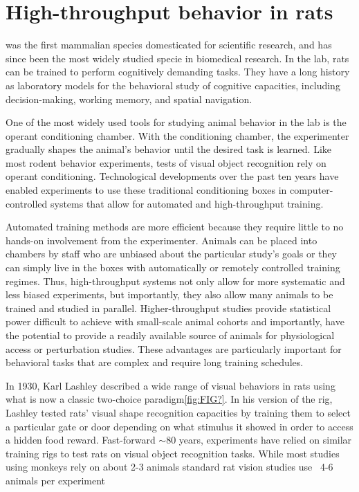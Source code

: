 
\chapter{High-throughput behavior in rats}
 was the first mammalian species domesticated for scientific research\cite{Jacob199}, and has since been the most widely studied specie in biomedical research. In the lab, rats can be trained to perform cognitively demanding tasks. They have a long history as laboratory models for the behavioral study of cognitive capacities, including decision-making\cite{Brunton2013, Raposo2012, Miller2017TwoStep, Piet2018RatsEnvironment}, working memory\cite{Bratch2016}, and spatial navigation\cite{OKeefe1971, Whishaw1995, Aronov2014}. 

One of the most widely used tools for studying animal behavior in the lab is the operant conditioning chamber. With the conditioning chamber, the experimenter gradually shapes the animal's behavior until the desired task is learned. Like most rodent behavior experiments, tests of visual object recognition rely on operant conditioning. Technological developments over the past ten years have enabled experiments to use these traditional conditioning boxes in computer-controlled systems that allow for automated and high-throughput training. 

Automated training methods are more efficient because they require little to no hands-on involvement from the experimenter. Animals can be placed into chambers by staff who are unbiased about the particular study's goals or they can simply live in the boxes with automatically or remotely controlled training regimes\cite{Qiao2018, Poddar2013, Miller2017Twostep}. Thus, high-throughput systems not only allow for more systematic and less biased experiments, but importantly, they also allow many animals to be trained and studied in parallel. Higher-throughput studies provide statistical power difficult to achieve with small-scale animal cohorts and importantly, have the potential to provide a readily available source of animals for physiological access or perturbation studies. These advantages are particularly important for behavioral tasks that are complex and require long training schedules.

In 1930, Karl Lashley\cite{Lashley1930} described a wide range of visual behaviors in rats using what is now a classic two-choice paradigm\ref{fig:FIG?}. In his version of the rig, Lashley tested rats' visual shape recognition capacities by training them to select a particular gate or door depending on what stimulus it showed in order to access a hidden food reward. Fast-forward $\sim$80 years, experiments have relied on similar training rigs to test rats on visual object recognition tasks\cite{Zoccolan2009, ETC}. While most studies using monkeys rely on about 2-3 animals standard rat vision studies use ~4-6 animals per experiment\cite{Vermaercke2012, Tafazoli2012Transformation-TolerantPriming}

